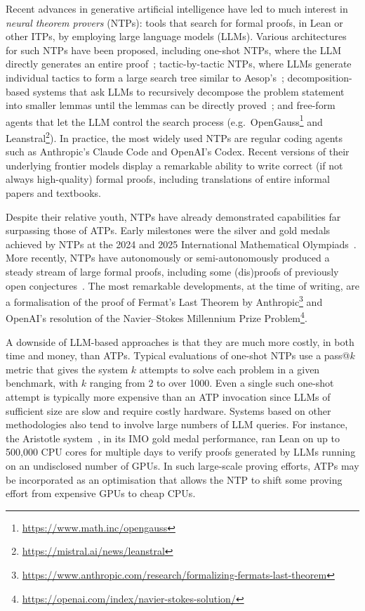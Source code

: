 Recent advances in generative artificial intelligence have led to much interest in \emph{neural theorem provers} (NTPs): tools that search for formal proofs, in Lean or other ITPs, by employing large language models (LLMs).
Various architectures for such NTPs have been proposed, including one-shot NTPs, where the LLM directly generates an entire proof~\cite{DeepSeekProver,GoedelProver,GoedelProverV2}; tactic-by-tactic NTPs, where LLMs generate individual tactics to form a large search tree similar to Aesop's~\cite{Lample22,LeanDojo,ABEL,Aristotle,AlphaProof,DeepSeekProverV15}; decomposition-based systems that ask LLMs to recursively decompose the problem statement into smaller lemmas until the lemmas can be directly proved~\cite{DSP,Hilbert,SeedProver}; and free-form agents that let the LLM control the search process (e.g.\ OpenGauss\footnote{\url{https://www.math.inc/opengauss}} and Leanstral\footnote{\url{https://mistral.ai/news/leanstral}}).
In practice, the most widely used NTPs are regular coding agents such as Anthropic's Claude Code and OpenAI's Codex.
Recent versions of their underlying frontier models display a remarkable ability to write correct (if not always high-quality) formal proofs, including translations of entire informal papers and textbooks.

Despite their relative youth, NTPs have already demonstrated capabilities far surpassing those of ATPs.
Early milestones were the silver and gold medals achieved by NTPs at the 2024 and 2025 International Mathematical Olympiads~\cite{AlphaProof,Aristotle,SeedProver}.
More recently, NTPs have autonomously or semi-autonomously produced a steady stream of large formal proofs, including some (dis)proofs of previously open conjectures~\cite{Gauss,AlexeevMixon25,AxiomProverPutnam25,Schmitt25,Erdos728,Ilin26,ConjectureResolution,MunkresIsabelle,Kahle26,AlphaProofNexus,Mazur26,TaoSendov,FelConjecture,ParityDifferentials,PrimeGapsLib}.
The most remarkable developments, at the time of writing, are a formalisation of the proof of Fermat's Last Theorem by Anthropic\footnote{\url{https://www.anthropic.com/research/formalizing-fermats-last-theorem}} and OpenAI's resolution of the Navier--Stokes Millennium Prize Problem\footnote{\url{https://openai.com/index/navier-stokes-solution/}}.

A downside of LLM-based approaches is that they are much more costly, in both time and money, than ATPs.
Typical evaluations of one-shot NTPs use a pass@$k$ metric that gives the system $k$ attempts to solve each problem in a given benchmark, with $k$ ranging from 2 to over 1000.
Even a single such one-shot attempt is typically more expensive than an ATP invocation since LLMs of sufficient size are slow and require costly hardware.
Systems based on other methodologies also tend to involve large numbers of LLM queries.
For instance, the Aristotle system~\cite{Aristotle}, in its IMO gold medal performance, ran Lean on up to 500,000 CPU cores for multiple days to verify proofs generated by LLMs running on an undisclosed number of GPUs.
In such large-scale proving efforts, ATPs may be incorporated as an optimisation that allows the NTP to shift some proving effort from expensive GPUs to cheap CPUs.

